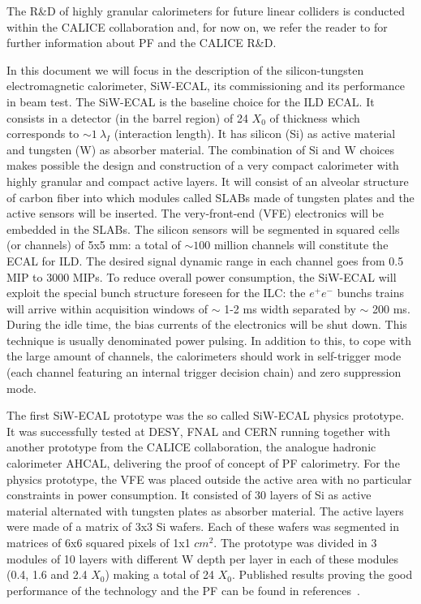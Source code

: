 \documentclass[a4paper,11pt]{article}
\begin{document}
The R\&D of highly granular calorimeters for future linear colliders is conducted within the CALICE collaboration and, for now on, we refer the reader to \cite{Sefkow:2015hna} for further information about PF and the CALICE R\&D.

In this document we will focus in the description of the silicon-tungsten electromagnetic calorimeter,
SiW-ECAL, its commissioning and its performance in beam test.
The SiW-ECAL is the baseline choice for the ILD ECAL. It consists in a detector (in the barrel region) of 24 $X_{0}$ of thickness which corresponds to $\sim 1~\lambda_{I}$ (interaction length).
It has silicon (Si) as active material and tungsten (W) as absorber material.
The combination of Si and W choices  makes possible the design and construction
of a very compact calorimeter with highly granular and compact active layers.
It will consist of an alveolar structure of carbon fiber into which modules called SLABs made of tungsten
plates and the active sensors will be inserted. The very-front-end (VFE) electronics will be
embedded in the SLABs. The silicon sensors will be segmented
in squared cells (or channels) of 5x5 mm: a total of $\sim 100$ million channels will constitute the ECAL for ILD.
The desired signal dynamic range in each channel goes from 0.5 MIP to 3000 MIPs.
To reduce overall power consumption, the SiW-ECAL will exploit the special bunch structure
foreseen for the ILC: the $e^{+}e^{-}$ bunchs trains will arrive within
acquisition windows of $\sim$ 1-2 ms width separated by $\sim$ 200 ms. During the idle time, the bias currents of the electronics will be shut down.
This technique is usually denominated power pulsing. In addition to this, to cope with the large amount of channels, the calorimeters should work in self-trigger mode (each channel featuring an internal trigger decision chain) and zero suppression mode. 

The first SiW-ECAL prototype was the so called SiW-ECAL physics prototype.
It was successfully tested at DESY, FNAL and CERN running together with another prototype from the CALICE
collaboration, the analogue hadronic calorimeter AHCAL, delivering the proof of concept of PF calorimetry.
For the physics prototype, the VFE was placed outside the active area with no particular constraints in power consumption.
It consisted of 30 layers of Si as active material alternated with tungsten plates as absorber material.
The active layers were made of a matrix of 3x3 Si wafers. Each of these wafers was segmented in matrices of
6x6 squared pixels of 1x1 $cm^{2}$.
The prototype was divided in 3 modules of 10 layers with different W depth per layer in each of these modules
(0.4, 1.6 and 2.4 $X_{0}$) making a total of 24 $X_{0}$.
Published results proving the good performance of the technology and the PF can be found in references~\cite{Adloff:2011ha,Anduze:2008hq,Adloff:2008aa,Adloff:2010xj,CALICE:2011aa,Bilki:2014uep}.
\end{document}
